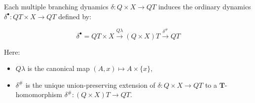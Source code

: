 Each multiple branching dynamics $\delta: Q \times X \longrightarrow QT$ induces the ordinary dynamics $\delta^\bullet: QT \times X \longrightarrow QT$ defined by:

$$\delta^\bullet = QT \times X \xrightarrow{Q\lambda} (Q \times X)T \xrightarrow{\delta^\#} QT$$

Here:
\begin{itemize}
\item $Q\lambda$ is the canonical map $(A, x) \mapsto A \times \{x\}$,
\item $\delta^\#$ is the unique union-preserving extension of $\delta : Q \times X \to QT$ to a $\mathbf{T}$-homomorphism $\delta^\# : (Q \times X)T \to QT$.
\end{itemize}

